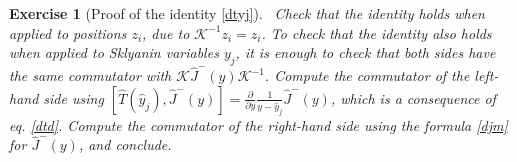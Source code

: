 \documentclass[12pt, a4paper, notitlepage, twoside]{report}
\numberwithin{equation}{section}
\theoremstyle{break}
\newtheorem{exo}{Exercise}[chapter]
\begin{document}
\begin{exo}[Proof of the identity \eqref{dtyj}]
 ~\label{exoktk}
Check that the identity holds when applied to positions $z_i$, due to $\mathcal{K}^{-1}z_i = z_i$. 
To check that the identity also holds when applied to Sklyanin variables $y_j$, it is enough to check 
that both sides have the same commutator with $\mathcal{K}\hat{J}^-(y)\mathcal{K}^{-1}$. 
Compute the commutator of the left-hand side using $[\hat{T}(\hat{y}_j),\hat{J}^-(y)]={\frac{\partial}{\partial y}}\frac{1}{y-\hat{y}_j}\hat{J}^-(y)$, which is a consequence of eq. \eqref{dtd}.
Compute the commutator of the 
right-hand side using the formula \eqref{djm} for $\hat{J}^-(y)$, and conclude.
\end{exo}




%

\printindex
\end{document}
